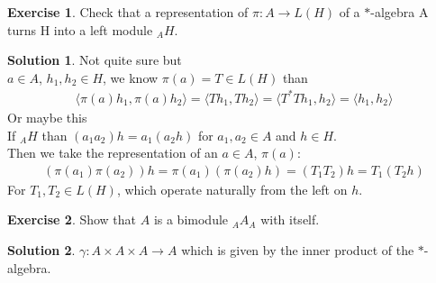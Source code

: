 \documentclass[a4paper]{article}
\theoremstyle{definition}
\theoremstyle{definition}
\theoremstyle{theorem}
\theoremstyle{theorem}
\newtheorem{exercise}{Exercise}
\theoremstyle{definition}
\newtheorem{solution}{Solution}
\begin{document}
\begin{exercise}
    Check that a representation of $\pi : A \rightarrow L(H)$ of a $*$-algebra A turns H into a
    left module ${}_A H$.
\end{exercise}
\begin{solution}
    Not quite sure but \\
    $a \in A$, $h_1, h_2 \in H$, we know $\pi (a) = T \in L(H)$ than
    \begin{align*}
        \langle \pi (a) h_1, \pi (a) h_2\rangle  = \langle T h_1, T h_2\rangle  = \langle T^*T h_1, h_2\rangle  = \langle h_1, h_2\rangle
    \end{align*}
    Or maybe this \\
    If $_A H$ than $(a_1a_2) h = a_1 (a_2 h)$ for $a_1, a_2 \in A$ and $h \in H$.\\
    Then we take the representation of an $a \in A$, $\pi (a)$:
    \begin{align*}
        (\pi(a_1)\pi(a_2))h = \pi(a_1)(\pi(a_2) h) = (T_1T_2) h = T_1 (T_2 h)
    \end{align*}
    For $T_1, T_2 \in L(H)$, which operate naturally from the left on $h$.
\end{solution}

\begin{exercise}
    Show that $A$ is a bimodule ${}_A A_A$ with itself.
\end{exercise}

\begin{solution}
    $\gamma: A\times A\times A \rightarrow A$ which is given by the inner product of the $*$-algebra.
\end{solution}
\end{document}
